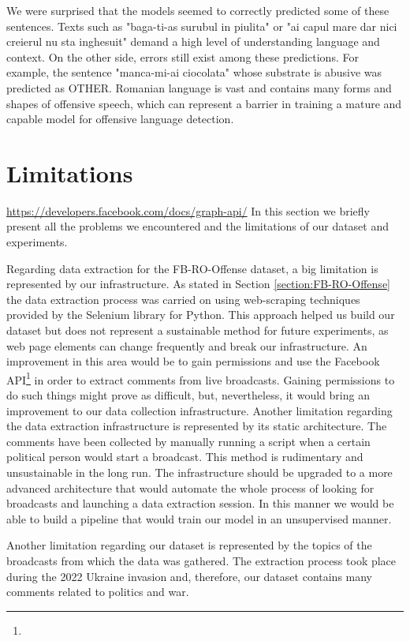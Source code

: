 \documentclass[12pt,a4paper]{report}
\begin{document}
We were surprised that the models seemed to correctly predicted some of these sentences. Texts such as "baga-ti-as surubul in piulita" or "ai capul mare dar nici creierul nu sta inghesuit" demand a high level of understanding language and context. On the other side, errors still exist among these predictions. For example, the sentence "manca-mi-ai ciocolata" whose substrate is abusive was predicted as OTHER. Romanian language is vast and contains many forms and shapes of offensive speech, which can represent a barrier in training a mature and capable model for offensive language detection.

\section{Limitations}
\urldef{\urlFacebookAPI}\url{https://developers.facebook.com/docs/graph-api/}
In this section we briefly present all the problems we encountered and the limitations of our dataset and experiments.

Regarding data extraction for the FB-RO-Offense dataset, a big limitation is represented by our infrastructure. As stated in Section \ref{section:FB-RO-Offense} the data extraction process was carried on using web-scraping techniques provided by the Selenium library for Python. This approach helped us build our dataset but does not represent a sustainable method for future experiments, as web page elements can change frequently and break our infrastructure. An improvement in this area would be to gain permissions and use the Facebook API\footnote{\urlFacebookAPI} in order to extract comments from live broadcasts. Gaining permissions to do such things might prove as difficult, but, nevertheless, it would bring an improvement to our data collection infrastructure. Another limitation regarding the data extraction infrastructure is represented by its static architecture. The comments have been collected by manually running a script when a certain political person would start a broadcast. This method is rudimentary and unsustainable in the long run. The infrastructure should be upgraded to a more advanced architecture that would automate the whole process of looking for broadcasts and launching a data extraction session. In this manner we would be able to build a pipeline that would train our model in an unsupervised manner.

Another limitation regarding our dataset is represented by the topics of the broadcasts from which the data was gathered. The extraction process took place during the 2022 Ukraine invasion and, therefore, our dataset contains many comments related to
politics and war.
\end{document}
